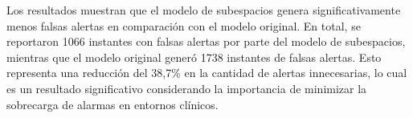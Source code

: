 Los resultados muestran que el modelo de subespacios genera significativamente menos falsas alertas en comparación con el modelo original. En total, se reportaron 1066 instantes con falsas alertas por parte del modelo de subespacios, mientras que el modelo original generó 1738 instantes de falsas alertas. Esto representa una reducción del 38,7\% en la cantidad de alertas innecesarias, lo cual es un resultado significativo considerando la importancia de minimizar la sobrecarga de alarmas en entornos clínicos.
